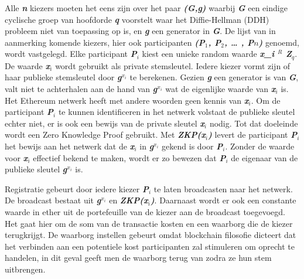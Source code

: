 			Alle \textbf{\textit{n}} kiezers moeten het eens zijn over het paar \textbf{\textit{(G,g)}} waarbij \textbf{\textit{G}} een eindige cyclische groep van hoofdorde \textbf{\textit{q}} voorstelt waar het Diffie-Hellman (DDH) probleem niet van toepassing op is, en \textbf{\textit{g}} een generator in \textbf{\textit{G}}. De lijst van in aanmerking komende kiezers, hier ook participanten \textbf{\textit{(P$_{1}$, P$_{2}$, … , P${n}$)}} genoemd, wordt vastgelegd. Elke participant \textbf{\textit{P$_{i}$}} kiest een unieke random waarde  \textbf{\textit{x_{i} \in $^{R}$ Z$_{q}$}}. De waarde \textbf{\textit{x$_{i}$}} wordt gebruikt als private stemsleutel. Iedere kiezer vormt zijn of haar publieke stemsleutel door \textbf{\textit{g$^{x_{i}}$}} te berekenen. Gezien \textbf{\textit{g}} een generator is van \textbf{\textit{G}}, valt niet te achterhalen aan de hand van \textbf{\textit{g$^{x_{i}}$}} wat de eigenlijke waarde van \textbf{\textit{x$_{i}$}} is. Het Ethereum netwerk heeft met andere woorden geen kennis van \textbf{\textit{x$_{i}$}}. Om de participant \textbf{\textit{P$_{i}$}} te kunnen identificeren in het netwerk volstaat de publieke sleutel echter niet, er is ook een bewijs van de private sleutel \textbf{\textit{x$_{i}$}} nodig. Tot dat doeleinde wordt een Zero Knowledge Proof gebruikt. Met \textbf{\textit{ZKP(x$_{i}$)}} levert de participant \textbf{\textit{P$_{i}$}}  het bewijs aan het netwerk dat de \textbf{\textit{x$_{i}$}}  in \textbf{\textit{g$^{x_{i}}$}} gekend is door \textbf{\textit{P$_{i}$}}. Zonder de waarde voor \textbf{\textit{x$_{i}$}}  effectief bekend te maken, wordt er zo bewezen dat \textbf{\textit{P$_{i}$}} de eigenaar van de publieke sleutel \textbf{\textit{g$^{x_{i}}$}} is.
			
			Registratie gebeurt door iedere kiezer \textbf{\textit{P$_{i}$}} te laten broadcasten naar het netwerk. De broadcast bestaat uit \textbf{\textit{g$^{x_{i}}$}}  en \textbf{\textit{ZKP(x$_{i}$)}}. Daarnaast wordt er ook een constante waarde in ether uit de portefeuille van de kiezer aan de broadcast toegevoegd. Het gaat hier om de som van de transactie kosten en een waarborg die de kiezer terugkrijgt. De waarborg instellen gebeurt omdat blockchain filosofie dicteert dat het verbinden aan een potentiele kost participanten zal stimuleren om oprecht te handelen, in dit geval geeft men de waarborg terug van zodra ze hun stem uitbrengen. 
			

